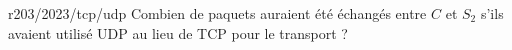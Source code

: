 \begin{question}{r203/2023/tcp/udp}
  Combien de paquets auraient été échangés entre $C$ et $S_2$ s'ils
  avaient utilisé UDP au lieu de TCP pour le transport ?
  \begin{reponses}
    \lastchoices
  \end{reponses}
\end{question}
